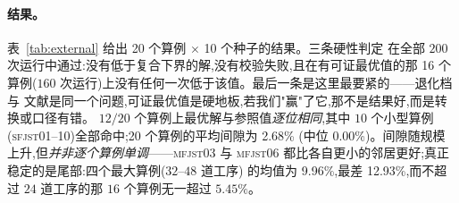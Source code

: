 \documentclass[manuscript,screen,review]{acmart}
\newcommand{\NSeeds}{10}
\newcommand{\PubNInst}{20}
\newcommand{\PubNOpt}{16}                 %
\newcommand{\PubNMatch}{12}               %
\newcommand{\PubGapMean}{2.68\%}          %
\newcommand{\PubGapMed}{0.00\%}
\newcommand{\PubGapMax}{12.93\%}
\newcommand{\PubGapBig}{9.96\%}           %
\begin{document}
\paragraph{结果。}
表~\ref{tab:external} 给出 \PubNInst{} 个算例 $\times$ \NSeeds{} 个种子的结果。三条硬性判定
在全部 $200$ 次运行中通过:没有低于复合下界的解,没有校验失败,且在有可证最优值的那
\PubNOpt{} 个算例($160$ 次运行)上没有任何一次低于该值。最后一条是这里最要紧的——退化档与
文献是同一个问题,可证最优值是硬地板,若我们"赢"了它,那不是结果好,而是转换或口径有错。
$\PubNMatch{}/\PubNInst{}$ 个算例上最优解与参照值\emph{逐位相同},其中 $10$ 个小型算例
(\textsc{sfjst}01--10)全部命中;\PubNInst{} 个算例的平均间隙为 \PubGapMean{}
(中位 \PubGapMed{})。间隙随规模上升,但\emph{并非逐个算例单调}——\textsc{mfjst}03 与
\textsc{mfjst}06 都比各自更小的邻居更好;真正稳定的是尾部:四个最大算例($32$--$48$ 道工序)
的均值为 \PubGapBig{},最差 \PubGapMax{},而不超过 $24$ 道工序的那 $16$ 个算例无一超过
$5.45\%$。
\end{document}
